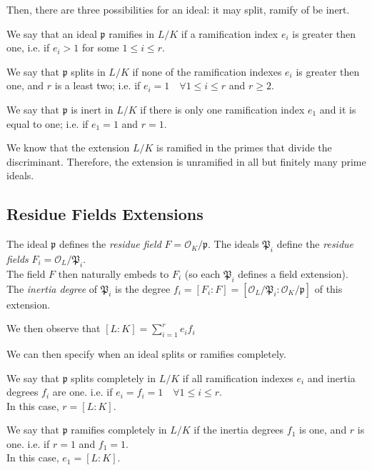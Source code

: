 Then, there are three possibilities for an ideal: it may split, ramify of be inert.
\begin{definition}
    We say that an ideal $\mathfrak{p}$ ramifies in $L/K$ if a ramification index $e_i$ is greater then one, 
    i.e. if $e_i>1$ for some $1 \leq i \leq r$.
\end{definition}
\begin{definition}
    We say that $\mathfrak{p}$ splits in $L/K$ if none of the ramification indexes $e_i$ is greater then one, and $r$ is a least two; 
    i.e. if $e_i=1 \quad \forall 1 \leq i \leq r$ and $r \geq 2$.
\end{definition}
\begin{definition}
    We say that $\mathfrak{p}$ is inert in $L/K$ if there is only one ramification index $e_1$ and it is equal to one;
    i.e. if $e_1=1$ and $r=1$.
\end{definition}
We know that the extension $L/K$ is ramified in the primes that divide the discriminant. Therefore, the extension is unramified in all but finitely many prime ideals.


\subsection{Residue Fields Extensions}
The ideal $\mathfrak{p}$ defines the \textit{residue field} $F=\mathcal{O}_K/\mathfrak{p}$.
The ideals $\mathfrak{P}_i$ define the \textit{residue fields} $F_i=\mathcal{O}_L/\mathfrak{P}_i$.\\
The field $F$ then naturally embeds to $F_i$ (so each $\mathfrak{P}_i$ defines a field extension).
The \textit{inertia degree} of $\mathfrak{P}_i$ is the degree $f_i=[F_i:F]=[\mathcal{O}_L/\mathfrak{P}_i:\mathcal{O}_K/\mathfrak{p}]$ of this extension.

We then observe that $[L:K] = \sum_{i=1}^r e_if_i$

We can then specify when an ideal splits or ramifies completely.
\begin{definition}
    We say that $\mathfrak{p}$ splits completely in $L/K$ if all ramification indexes $e_i$ and inertia degrees $f_i$ are one.
    i.e. if $e_i=f_i=1 \quad \forall 1 \leq i \leq r$.\\
    In this case, $r=[L:K]$.
\end{definition}
\begin{definition}
    We say that $\mathfrak{p}$ ramifies completely in $L/K$ if the inertia degrees $f_1$ is one, and $r$ is one.
    i.e. if $r=1$ and $f_1=1$.\\
    In this case, $e_1=[L:K]$.
\end{definition}

